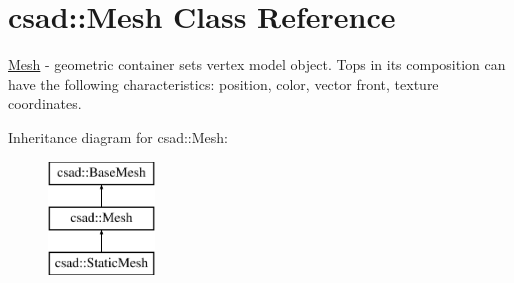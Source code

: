 \hypertarget{classcsad_1_1_mesh}{\section{csad\-:\-:Mesh Class Reference}
\label{classcsad_1_1_mesh}
}


\hyperlink{classcsad_1_1_mesh}{Mesh} -\/ geometric container sets vertex model object. Tops in its composition can have the following characteristics\-: position, color, vector front, texture coordinates.  


Inheritance diagram for csad\-:\-:Mesh\-:\begin{figure}[H]
\begin{center}
\leavevmode
\includegraphics[height=3.000000cm]{classcsad_1_1_mesh}
\end{center}
\end{figure}

